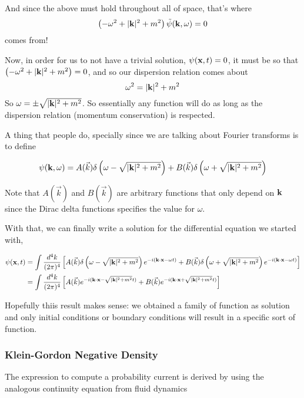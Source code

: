 And since the above must hold throughout all of space, that's where
$$
\left(-\omega^2 + |\boldsymbol{\mathbf{k}}|^2 + m^2 \right) \tilde{\psi}(\boldsymbol{\mathbf{k}}, \omega) = 0
$$
comes from!

Now, in order for us to not have a trivial solution, $\psi(\boldsymbol{\mathbf{x}}, t) = 0$, it must be so that
$\left(-\omega^2 + |\boldsymbol{\mathbf{k}}|^2 + m^2 \right) = 0$, and so our dispersion relation comes about
$$
\omega^2 = |\boldsymbol{\mathbf{k}}|^2 + m^2
$$
So $\omega = \pm \sqrt{ |\boldsymbol{\mathbf{k}}|^2 + m^2 }$.
So essentially any function will do as long as the dispersion relation (momentum conservation) is respected.

A thing that people do, specially since we are talking about Fourier transforms is to define

$$
\psi(\boldsymbol{\mathbf{k}}, \omega) = A(\vec{k}) \delta\left( \omega - \sqrt{ |\boldsymbol{\mathbf{k}}|^2 + m^2 }\right) +
    B(\vec{k}) \delta\left( \omega + \sqrt{ |\boldsymbol{\mathbf{k}}|^2 + m^2 }\right)
$$

Note that $A(\vec{k})$ and $B(\vec{k})$ are arbitrary functions that only depend on $\boldsymbol{\mathbf{k}}$ since the
Dirac delta functions specifies the value for $\omega$.

With that, we can finally write a solution for the differential equation we started with,

\begin{align*}
\psi(\boldsymbol{\mathbf{x}}, t) &=
    \int \frac{d^4k}{(2\pi)^4} \left[
        A(\vec{k}) \delta\left( \omega - \sqrt{ |\boldsymbol{\mathbf{k}}|^2 + m^2 }\right) e^{-i(\boldsymbol{\mathbf{k}}\cdot\boldsymbol{\mathbf{x}} -\omega t)} +
        B(\vec{k}) \delta\left( \omega + \sqrt{ |\boldsymbol{\mathbf{k}}|^2 + m^2 }\right) e^{-i(\boldsymbol{\mathbf{k}}\cdot\boldsymbol{\mathbf{x}} -\omega t)}
    \right] \\
&= \int \frac{d^4k}{(2\pi)^4} \left[
    A(\vec{k}) e^{-i(\boldsymbol{\mathbf{k}}\cdot\boldsymbol{\mathbf{x}} - \sqrt{ |\boldsymbol{\mathbf{k}}|^2 + m^2 } t)} +
    B(\vec{k}) e^{-i(\boldsymbol{\mathbf{k}}\cdot\boldsymbol{\mathbf{x}} + \sqrt{ |\boldsymbol{\mathbf{k}}|^2 + m^2 } t)}
\right]
\end{align*}

Hopefully thiis result makes sense: we obtained a family of function as solution and only initial conditions or
boundary conditions will result in a specific sort of function.




\subsubsection{Klein-Gordon Negative Density}


The expression to compute a probability current is derived by using the analogous continuity equation
from fluid dynamics

